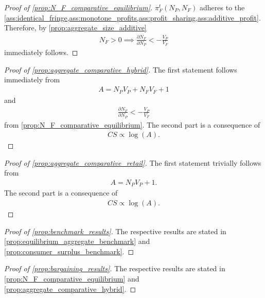 \documentclass[a4paper]{article}
\begin{document}
\begin{proof}[Proof of \cref{prop:N_F_comparative_equilibrium}]
    $\pi^t_F(N_P ,N_F)$ adheres to the \cref{ass:identical_fringe,ass:monotone_profits,ass:profit_sharing,ass:additive_profit}.
    Therefore, by \cref{prop:aggregate_size_additive}
    \begin{align*}
        N_F > 0 \implies \frac{\partial N_F}{\partial N_P} < -\frac{V_P}{V_F}
    \end{align*}
    immediately follows.
\end{proof}

\begin{proof}[Proof of \cref{prop:aggregate_comparative_hybrid}]
    The first statement follows immediately from
    \begin{align*}
        A = N_P V_P + N_F V_F + 1
    \end{align*}
    and
    \begin{align*}
        \frac{\partial N_F}{\partial N_P} < -\frac{V_P}{V_F}
    \end{align*}
    from \cref{prop:N_F_comparative_equilibrium}.
    The second part is a consequence of
    \begin{align*}
        CS \propto \log(A).
    \end{align*}
\end{proof}

\begin{proof}[Proof of \cref{prop:aggregate_comparative_retail}]
    The first statement trivially follows from
    \begin{align*}
        A = N_P V_P + 1.
    \end{align*}
    The second part is a consequence of
    \begin{align*}
        CS \propto \log(A).
    \end{align*}
\end{proof}

\begin{proof}[Proof of \cref{prop:benchmark_results}]
    The respective results are stated in \cref{prop:equilibrium_aggregate_benchmark} and \cref{prop:consumer_surplus_benchmark}.
\end{proof}

\begin{proof}[Proof of \cref{prop:bargaining_results}]
    The respective results are stated in \cref{prop:N_F_comparative_equilibrium} and \cref{prop:aggregate_comparative_hybrid}.
\end{proof}
\end{document}
